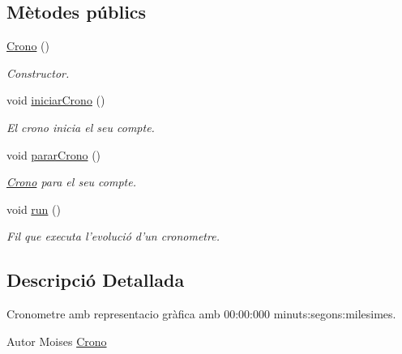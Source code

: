 \subsection*{Mètodes públics}
\begin{DoxyCompactItemize}
\item 
\hyperlink{classinterficie_1_1components_1_1_crono_afd62bd4f1354e15c5b7048c4f874bae3}{Crono} ()
\begin{DoxyCompactList}\small\item\em Constructor. \end{DoxyCompactList}\item 
void \hyperlink{classinterficie_1_1components_1_1_crono_aa890cf3bea27a9c0822bf6066de35929}{iniciar\+Crono} ()
\begin{DoxyCompactList}\small\item\em El crono inicia el seu compte. \end{DoxyCompactList}\item 
void \hyperlink{classinterficie_1_1components_1_1_crono_a0d8681481d3795a79da8a6c47dac8811}{parar\+Crono} ()
\begin{DoxyCompactList}\small\item\em \hyperlink{classinterficie_1_1components_1_1_crono}{Crono} para el seu compte. \end{DoxyCompactList}\item 
\hypertarget{classinterficie_1_1components_1_1_crono_a0ecb7df579cc0a6476c56517afd50627}{void \hyperlink{classinterficie_1_1components_1_1_crono_a0ecb7df579cc0a6476c56517afd50627}{run} ()}\label{classinterficie_1_1components_1_1_crono_a0ecb7df579cc0a6476c56517afd50627}

\begin{DoxyCompactList}\small\item\em Fil que executa l'evolució d'un cronometre. \end{DoxyCompactList}\end{DoxyCompactItemize}


\subsection{Descripció Detallada}
Cronometre amb representacio gràfica amb 00\+:00\+:000 minuts\+:segons\+:milesimes. 

\begin{DoxyAuthor}{Autor}
Moises  \hyperlink{classinterficie_1_1components_1_1_crono}{Crono} 
\end{DoxyAuthor}


